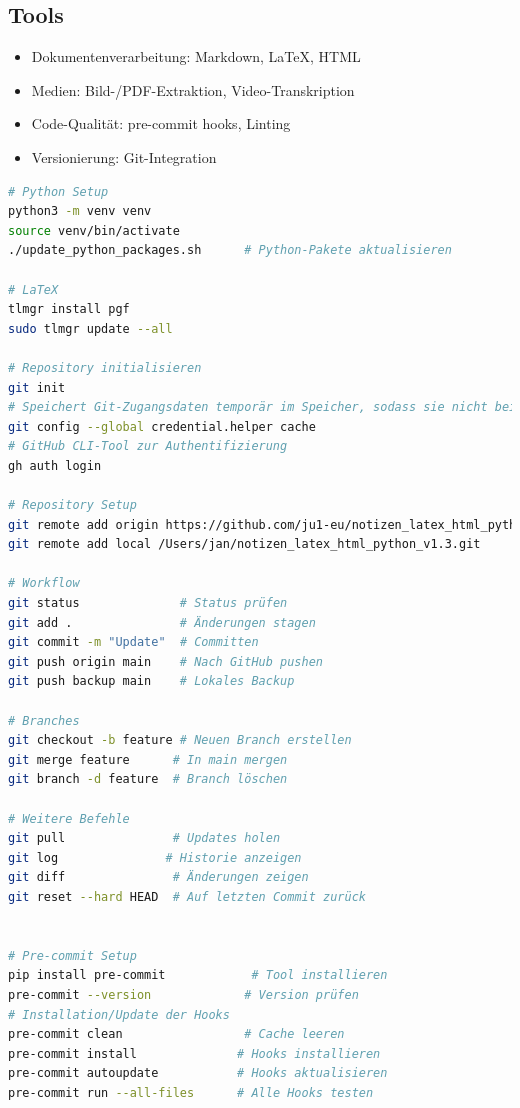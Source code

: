 \documentclass{content/vorlage-design-main}
\begin{document}
\subsection{Tools}\label{tools}

\begin{itemize}

\item
  Dokumentenverarbeitung: Markdown, LaTeX, HTML
\item
  Medien: Bild-/PDF-Extraktion, Video-Transkription
\item
  Code-Qualität: pre-commit hooks, Linting
\item
  Versionierung: Git-Integration
\end{itemize}

\begin{lstlisting}[language=bash]
# Python Setup
python3 -m venv venv
source venv/bin/activate
./update_python_packages.sh      # Python-Pakete aktualisieren

# LaTeX
tlmgr install pgf
sudo tlmgr update --all

# Repository initialisieren
git init
# Speichert Git-Zugangsdaten temporär im Speicher, sodass sie nicht bei jedem Push/Pull erneut eingegeben werden müssen.
git config --global credential.helper cache
# GitHub CLI-Tool zur Authentifizierung
gh auth login

# Repository Setup
git remote add origin https://github.com/ju1-eu/notizen_latex_html_python_v1.3.git
git remote add local /Users/jan/notizen_latex_html_python_v1.3.git

# Workflow
git status              # Status prüfen
git add .               # Änderungen stagen
git commit -m "Update"  # Committen
git push origin main    # Nach GitHub pushen
git push backup main    # Lokales Backup

# Branches
git checkout -b feature # Neuen Branch erstellen
git merge feature      # In main mergen
git branch -d feature  # Branch löschen

# Weitere Befehle
git pull               # Updates holen
git log               # Historie anzeigen
git diff               # Änderungen zeigen
git reset --hard HEAD  # Auf letzten Commit zurück


# Pre-commit Setup
pip install pre-commit            # Tool installieren
pre-commit --version             # Version prüfen
# Installation/Update der Hooks
pre-commit clean                 # Cache leeren
pre-commit install              # Hooks installieren
pre-commit autoupdate           # Hooks aktualisieren
pre-commit run --all-files      # Alle Hooks testen
\end{lstlisting}
\end{document}
